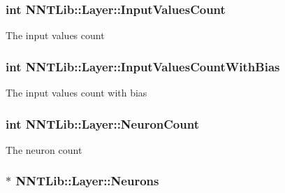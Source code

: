 \hypertarget{class_n_n_t_lib_1_1_layer_a5c968ed46039cbaa69f217c71fd74855}{}
\subsubsection[{Input\+Values\+Count}]{\setlength{\rightskip}{0pt plus 5cm}int N\+N\+T\+Lib\+::\+Layer\+::\+Input\+Values\+Count}\label{class_n_n_t_lib_1_1_layer_a5c968ed46039cbaa69f217c71fd74855}


The input values count 

\hypertarget{class_n_n_t_lib_1_1_layer_a3537c5d904445f7bebac1136c59e0503}{}
\subsubsection[{Input\+Values\+Count\+With\+Bias}]{\setlength{\rightskip}{0pt plus 5cm}int N\+N\+T\+Lib\+::\+Layer\+::\+Input\+Values\+Count\+With\+Bias}\label{class_n_n_t_lib_1_1_layer_a3537c5d904445f7bebac1136c59e0503}


The input values count with bias 

\hypertarget{class_n_n_t_lib_1_1_layer_aba659d85237baa7e0b3ba235d5313da6}{}
\subsubsection[{Neuron\+Count}]{\setlength{\rightskip}{0pt plus 5cm}int N\+N\+T\+Lib\+::\+Layer\+::\+Neuron\+Count}\label{class_n_n_t_lib_1_1_layer_aba659d85237baa7e0b3ba235d5313da6}


The neuron count 

\hypertarget{class_n_n_t_lib_1_1_layer_ae10597dc8e12d338fe40d902d6f26ef0}{}
\subsubsection[{Neurons}]{$\ast$ N\+N\+T\+Lib\+::\+Layer\+::\+Neurons}\label{class_n_n_t_lib_1_1_layer_ae10597dc8e12d338fe40d902d6f26ef0}


